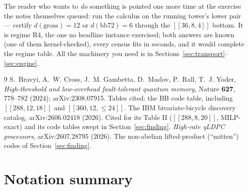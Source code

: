 \documentclass[11pt]{article}
\theoremstyle{plain}
\theoremstyle{definition}
\theoremstyle{remark}
\begin{document}

\medskip

The reader who wants to \emph{do} something is pointed one more time at
the exercise the notes themselves queued: run the calculus on the
running tower's lower pair --- certify $d(\mathrm{gross}) = 12$ or
$d(\mathrm{bb72}) = 6$ through the $[[36,8,4]]$ bottom. It is regime R4,
the one no headline instance exercised; both answers are known (one of
them kernel-checked), every census fits in seconds, and it would
complete the regime table. All the machinery you need is in
Sections~\ref{sec:transport}--\ref{sec:engine}.

\begin{thebibliography}{9}
 S.~Bravyi, A.~W. Cross, J.~M. Gambetta, D.~Maslov,
P.~Rall, T.~J. Yoder, \emph{High-threshold and low-overhead
fault-tolerant quantum memory}, Nature \textbf{627}, 778--782 (2024);
arXiv:2308.07915. Tables cited: the BB code table, including
$[[288,12,18]]$ and $[[360,12,\leq 24]]$.
 The IBM bivariate-bicycle discovery catalog,
arXiv:2606.02418 (2026). Cited for its Table II ($[[288,8,20]]$,
MILP-exact) and its code tables swept in Section~\ref{sec:finding}.
 \emph{High-rate qLDPC processors}, arXiv:2607.28795
(2026). The non-abelian lifted-product (``mitten'') codes of
Section~\ref{sec:finding}.
\end{thebibliography}

\appendix

\section{Notation summary}
\end{document}
